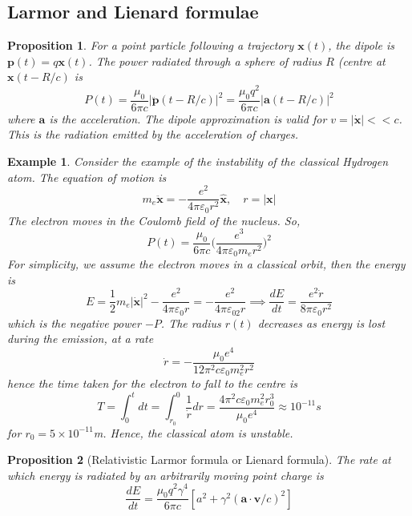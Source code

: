 \documentclass[a4paper]{article}
\newtheorem{eg}{Example}[section]
\theoremstyle{new}
\newtheorem{prop}{Proposition}[section]
\begin{document}
\subsection{Larmor and Lienard formulae}
\begin{prop}
For a point particle following a trajectory $\mathbf{x}(t)$, the dipole is $\mathbf{p}(t)=q\mathbf{x}(t)$. The power radiated through a sphere of radius $R$ (centre at $\mathbf{x}(t-R/c)$ is
$$P(t)=\frac{\mu_0}{6\pi c}|\mathbf{\ddot{p}}(t-R/c)|^2=\frac{\mu_0q^2}{6\pi c}|\mathbf{a}(t-R/c)|^2$$
where $\mathbf{a}$ is the acceleration. The dipole approximation is valid for $v=|\mathbf{\dot{x}}|<<c$. This is the radiation emitted by the acceleration of charges.
\end{prop}
\begin{eg}
Consider the example of the instability of the classical Hydrogen atom. The equation of motion is
$$m_e\mathbf{\ddot{x}}=-\frac{e^2}{4\pi\varepsilon_0r^2}\mathbf{\hat{x}},\quad r=|\mathbf{x}|$$
The electron moves in the Coulomb field of the nucleus. So,
$$P(t)=\frac{\mu_0}{6\pi c}\bigg(\frac{e^3}{4\pi\varepsilon_0m_er^2}\bigg)^2$$ For simplicity, we assume the electron moves in a classical orbit, then the energy is
$$E=\frac{1}{2}m_e|\mathbf{\dot{x}}|^2-\frac{e^2}{4\pi\varepsilon_0r}=-\frac{e^2}{4\pi\varepsilon_02r}\implies\frac{dE}{dt}=\frac{e^2\dot{r}}{8\pi\varepsilon_0r^2}$$
which is the negative power $-P$. The radius $r(t)$ decreases as energy is lost during the emission, at a rate
$$\dot{r}=-\frac{\mu_0e^4}{12\pi^2c\varepsilon_0m_e^2r^2}$$
hence the time taken for the electron to fall to the centre is
$$T=\int_0^tdt=\int_{r_0}^0\frac{1}{\dot{r}}dr=\frac{4\pi^2c\varepsilon_0m_e^2r_0^3}{\mu_0e^4}\approx10^{-11}s$$
for $r_0=5\times10^{-11}$m. Hence, the classical atom is unstable.
\end{eg}
\begin{prop}[Relativistic Larmor formula or Lienard formula]
The rate at which energy is radiated by an arbitrarily moving point charge is
$$\frac{dE}{dt}=\frac{\mu_0q^2\gamma^4}{6\pi c}[a^2+\gamma^2(\mathbf{a}\cdot\mathbf{v}/c)^2]$$
\end{prop}
\end{document}
